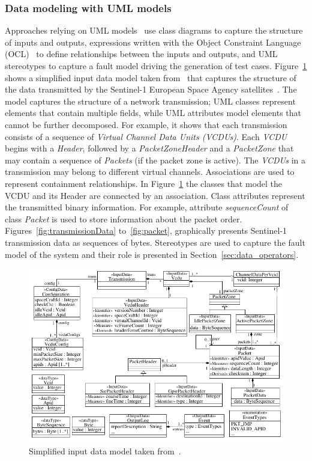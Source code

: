 

\subsubsection{Data modeling with UML models}

Approaches relying on UML models~\cite{di2015generating,di2015evolutionary} use class diagrams to capture the structure of inputs and outputs, expressions written with the Object Constraint Language (OCL)~\cite{OCL} to define relationships between the inputs and outputs, and UML stereotypes to capture a fault model driving the generation of test cases.
Figure~\ref{fig:dataModel} shows a simplified input data model taken from~\cite{di2015evolutionary} that captures the structure of the data transmitted by the Sentinel-1 European Space Agency satellites~\cite{esaSentinel}.
The model captures the structure of a network transmission; UML classes represent elements that contain multiple fields, while UML attributes model elements that cannot be further decomposed. For example, it shows that each transmission consists of a sequence of \emph{Virtual Channel Data Units (VCDUs)}. Each \emph{VCDU} begins with a \emph{Header}, followed by a \emph{PacketZoneHeader} and a \emph{PacketZone} that may contain a sequence of \emph{Packets} (if the packet zone is active).
The \emph{VCDUs} in a transmission may belong to different virtual channels.
Associations are used to represent containment relationships. In Figure~\ref{fig:dataModel} the classes that model the VCDU and its Header are connected by an association.
Class attributes represent the transmitted binary information. For example, attribute \emph{sequenceCount} of class \emph{Packet} is used to store information about the packet order.
Figures~\ref{fig:transmissionData} to~\ref{fig:packet}, graphically presents Sentinel-1 transmission data as sequences of bytes.
Stereotypes are used to capture the fault model of the system and their role is presented in Section~\ref{sec:data_operators}.

\begin{figure}[t!]
  \centering
    \includegraphics{images/classDiagramSmall}
      \caption{Simplified input data model taken from~\cite{di2015evolutionary}.}
      \label{fig:dataModel}
\end{figure}

